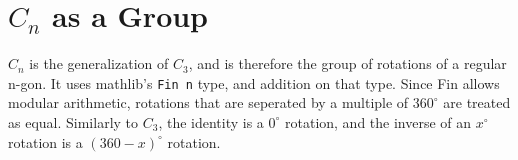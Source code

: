 \section{$C_n$ as a Group}

\begin{definition}[$C_n$]
    \label{definition : Cn}
    \leanok
    $C_n$ is the generalization of $C_3$, and is therefore the group of
    rotations of a regular n-gon. It uses mathlib's \verb|Fin n| type, and
    addition on that type. Since Fin allows modular arithmetic, rotations that
    are seperated by a multiple of $360^{\circ}$ are treated as equal. Similarly
    to $C_3$, the identity is a $0^{\circ}$ rotation, and the inverse of an
    $x ^{\circ}$ rotation is a $(360 - x)^{\circ}$ rotation.
\end{definition}
